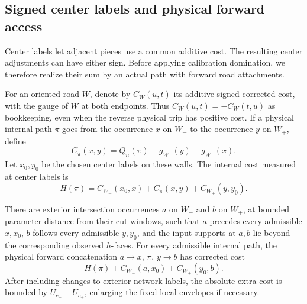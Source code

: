 \subsection{Signed center labels and physical forward access}

Center labels let adjacent pieces use a common additive cost.  The
resulting center adjustments can have either sign.  Before applying
calibration domination, we therefore realize their sum by an actual
path with forward road attachments.

For an oriented road $W$, denote by $C_W(u,t)$ its additive signed
corrected cost, with the gauge of $W$ at both endpoints.  Thus
$C_W(u,t)=-C_W(t,u)$ as bookkeeping, even when the reverse physical trip
has positive cost.  If a physical internal path $\pi$ goes from the
occurrence $x$ on $W_-$ to the occurrence $y$ on $W_+$, define
\[
 C_\pi(x,y)=Q_n(\pi)-g_{W_+}(y)+g_{W_-}(x).
\]
Let $x_0,y_0$ be the chosen center labels on these walls.  The internal
cost measured at center labels is
\begin{equation}\label{access:center-cost}
 H(\pi)=C_{W_-}(x_0,x)+C_\pi(x,y)+C_{W_+}(y,y_0).
\end{equation}

\begin{lemma}\label{access:physical}
There are exterior intersection occurrences $a$ on $W_-$ and $b$ on
$W_+$, at bounded parameter distance from their cut windows, such that
$a$ precedes every admissible $x,x_0$, $b$ follows every admissible $y,y_0$,
and the input supports at $a,b$ lie beyond the corresponding observed
$h$-faces.  For every admissible internal path, the physical forward
concatenation $a\to x$, $\pi$, $y\to b$ has corrected cost
\begin{equation}\label{access:physical-identity}
 H(\pi)+C_{W_-}(a,x_0)+C_{W_+}(y_0,b).
\end{equation}
After including changes to exterior network labels, the absolute extra
cost is bounded by $U_{c_-}+U_{c_+}$, enlarging the fixed local envelopes
if necessary.
\end{lemma}

